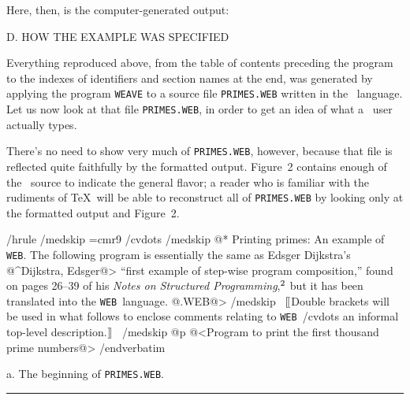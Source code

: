 \silentref{}
\silentref{}

Here, then, is the computer-generated output:

\bigskip
\CJrule
\medskip
\begingroup
\def\prune{}
\def\Z#1#2#3{\line{\ignorespaces#1\ \dotfill\ {\tensy x}#2}}
\def\M#1.{\MN#1.\iftrue\medbreak\startsection\ignorespaces}
\def\firstmod{1}
\def\N#1.#2.{\MN#1.\iftrue\nobreak
  \ifx\modno\firstmod\medskip\else\bigskip\fi
  \CJrule\medbreak\startsection
  {\bf\ignorespaces#2.\quad}\ignorespaces}
\def\inx{\par\medbreak
  \def\:##1, {\par\hangindent2em\noindent##1:\kern1em}
  \def\[##1]{$\underline{##1}$}
  \rm \rightskip0pt plus2.5em \tolerance10000 \let\*=\lapstar
  \hyphenpenalty10000 \parindent0pt}
\def\fin{\par\bigskip\CJrule\medbreak
  \parfillskip0pt plus1fil
  \def\note##1##2.{\hfil\penalty-1\hfilneg\quad{\eightrm##1 ##2.}}
  \def\U{\note{Used in}}
  \def\:{\par\hangindent 2em}\let\*=*}
\let\con=\par
\parskip=0pt
\expandafter\prune
\endgroup

\beginsection D. HOW THE EXAMPLE WAS SPECIFIED

Everything reproduced above, from the table of contents preceding the
program to the indexes of identifiers and section names at the end,
was generated by applying the program {\tt WEAVE} to a source file
{\tt PRIMES.WEB} written in the \WEB\ language. Let us now look at that
file {\tt PRIMES.WEB}, in order to get an idea of what a \WEB\ user
actually types.

There's no need to show very much of {\tt PRIMES.WEB}, however, because
that file is reflected quite faithfully by the formatted output. Figure~2
contains enough of the \WEB\ source to indicate the general flavor;
a reader who is familiar with the rudiments of \TeX\ will be able to
reconstruct all of {\tt PRIMES.WEB} by looking only at the formatted
output and Figure~2.

\leftfloat
\ttverbatim
/hrule
/medskip
\font\ninerm=cmr9
\let\mc=\ninerm %
\def\WEB{{\tt WEB}}
\def\PASCAL{{\mc PASCAL}}
\def\[{\ifhmode\ \fi$[\mkern-2mu[$}
\def\]{$]\mkern-2mu]$\ }
/cvdots
/medskip
@* Printing primes: An example of \WEB.
The following program is essentially the same
as Edsger Dijkstra's @^Dijkstra, Edsger@>
``first example of step-wise program
composition,'' found on pages 26--39
of his {\sl Notes on Structured
Programming},$^{2}$  but it has been
translated into the \WEB\ language. @.WEB@>
/medskip
\[Double brackets will be used in what
follows to enclose comments relating to \WEB\
/cvdots
an informal top-level description.\]
/medskip
@p @<Program to print the first thousand
prime numbers@>
/endverbatim
\medskip
\caption 2a. The beginning of {\tt PRIMES.WEB}.
\medskip
\hrule
\endfloat


